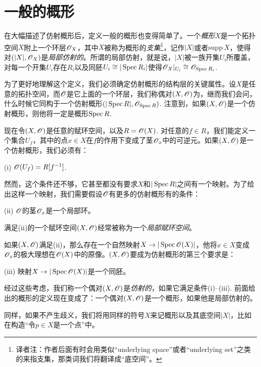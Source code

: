 \section{一般的概形}

在大幅描述了仿射概形后，定义一般的概形也变得简单了。一个\textit{概形}$X$是一个拓扑空间$X$附上一个环层$\mathscr{O}_X$，其中$X$被称为概形的\textit{支集}\footnote{译者注：作者后面有时会用类似``underlying space''或者``underlying set''之类的来指支集，那类词我们将翻译成“底空间”。}，记作$|X|$或者$\mathrm{supp}\,X$，使得对$(|X|,\mathscr{O}_X)$是\textit{局部仿射的}。所谓的局部仿射，就是说，$|X|$被一族开集$U_i$所覆盖，对每一个开集$U_i$存在$R_i$以及同胚$U_i\cong |\operatorname{Spec} R_i|$使得$\mathscr{O}_X|_{U_i}\cong \mathscr{O}_{\operatorname{Spec} R_i}$.

为了更好地理解这个定义，我们必须确定仿射概形的结构层的关键属性。设$X$是任意的拓扑空间，而$\mathscr{O}$是它上面的一个环层，我们称偶对$(X,\mathscr{O})$为，继而我们会问，什么时候它同构于一个仿射概形$(|\operatorname{Spec} R|,\mathscr{O}_{\operatorname{Spec} R})$. 注意到，如果$(X,\mathscr{O})$是一个仿射概形，则他将一定是概形$\operatorname{Spec} R$.

现在令$(X,\mathscr{O})$是任意的赋环空间，以及$R=\mathscr{O}(X)$. 对任意的$f\in R$，我们能定义一个集合$U_f$，其中的点$x\in X$在$f$的作用下变成了茎$\mathscr{O}_x$中的可逆元。如果$(X,\mathscr{O})$是一个仿射概形，我们必须有：
\begin{compactitem}
\item[(i)] $\mathscr{O}(U_f)=R[f^{-1}]$.
\end{compactitem}
然而，这个条件还不够，它甚至都没有要求$X$和$|\operatorname{Spec} R|$之间有一个映射。为了给出这样一个映射，我们需要假设$\mathscr{O}$有更多的仿射概形有的条件：
\begin{compactitem}
\item[(ii)] $\mathscr{O}$的茎$\mathscr{O}_x$是一个局部环。
\end{compactitem}
满足(ii)的一个赋环空间$(X,\mathscr{O})$经常被称为一个\textit{局部赋环空间}。

如果$(X,\mathscr{O})$满足(ii)，那么存在一个自然映射$X\to |\operatorname{Spec} \mathscr{O}(X)|$，他将$x\in X$变成$\mathscr{O}_x$的极大理想在$\mathscr{O}(X)$中的原像。$(X,\mathscr{O})$要成为仿射概形的第三个要求是：
\begin{compactitem}
\item[(iii)] 映射$X\to |\operatorname{Spec} \mathscr{O}(X)|$是一个同胚。
\end{compactitem}

经过这些考虑，我们称一个偶对$(X,\mathscr{O})$是\textit{仿射的}，如果它满足条件(i)--(iii). 前面给出的概形的定义现在变成了：一个偶对$(X,\mathscr{O})$是一个概形，如果他是局部仿射的。

同样，如果不产生歧义，我们将用同样的符号$X$来记概形以及其底空间$|X|$，比如在构造“令$p\in X$是一个点”中。

